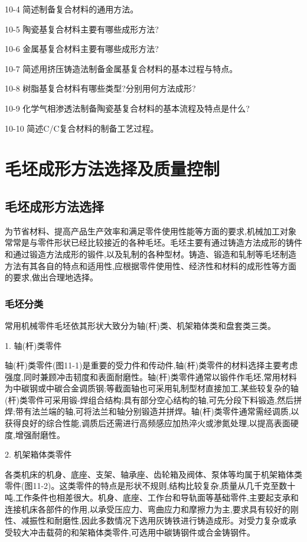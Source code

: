 \documentclass[UTF8]{ctexbook}
\newcommand{\◎}{\ensuremath{\bigcirc}}
\begin{document}
10-4 简述制备复合材料的通用方法。

10-5 陶瓷基复合材料主要有哪些成形方法?

10-6 金属基复合材料主要有哪些成形方法?

10-7 简述用挤压铸造法制备金属基复合材料的基本过程与特点。

10-8 树脂基复合材料有哪些类型?分别用何方法成形?

10-9 化学气相渗透法制备陶瓷基复合材料的基本流程及特点是什么?

10-10 简述C/C复合材料的制备工艺过程。


\chapter{毛坯成形方法选择及质量控制}

\section{毛坯成形方法选择}

为节省材料、提高产品生产效率和满足零件使用性能等方面的要求,机械加工对象常常是与零件形状已经比较接近的各种毛坯。毛坯主要有通过铸造方法成形的铸件和通过锻造方法成形的锻件,以及轧制的各种型材。铸造、锻造和轧制等毛坯制造方法有其各自的特点和适用性,应根据零件使用性、经济性和材料的成形性等方面的要求,做出合理地选择。

\subsection{毛坯分类}

常用机械零件毛坯依其形状大致分为轴(杆)类、机架箱体类和盘套类三类。

1. 轴(杆)类零件

轴(杆)类零件(图11-1)是重要的受力件和传动件,轴(杆)类零件的材料选择主要考虑强度,同时兼顾冲击韧度和表面耐磨性。轴(杆)类零件通常以锻件作毛坯,常用材料为中碳钢或中碳合金调质钢;等截面轴也可采用轧制型材直接加工,某些较复杂的轴(杆)类零件可采用锻-焊组合结构;具有部分空心结构的轴,可先分段下料锻造,然后拼焊;带有法兰端的轴,可将法兰和轴分别锻造并拼焊。轴(杆)类零件通常需经调质,以获得良好的综合性能,调质后还需进行高频感应加热淬火或渗氮处理,以提高表面硬度,增强耐磨性。

2. 机架箱体类零件

各类机床的机身、底座、支架、轴承座、齿轮箱及阀体、泵体等均属于机架箱体类零件(图11-2)。这类零件的特点是形状不规则,结构比较复杂,质量从几千克至数十吨,工作条件也相差很大。机身、底座、工作台和导轨面等基础零件,主要起支承和连接机床各部件的作用,以承受压应力、弯曲应力和摩擦力为主,要求具有较好的刚性、减振性和耐磨性,因此多数情况下选用灰铸铁进行铸造成形。对受力复杂或承受较大冲击载荷的和架箱体类零件,可选用中碳铸钢件或合金铸钢件。
\end{document}
